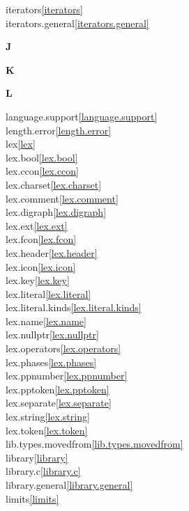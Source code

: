 \begin{multicols}{2}
iterators\quad\ref{iterators}\\
iterators.general\quad\ref{iterators.general}\\
\par \textbf{J}\par
\par \textbf{K}\par
\par \textbf{L}\par
language.support\quad\ref{language.support}\\
length.error\quad\ref{length.error}\\
lex\quad\ref{lex}\\
lex.bool\quad\ref{lex.bool}\\
lex.ccon\quad\ref{lex.ccon}\\
lex.charset\quad\ref{lex.charset}\\
lex.comment\quad\ref{lex.comment}\\
lex.digraph\quad\ref{lex.digraph}\\
lex.ext\quad\ref{lex.ext}\\
lex.fcon\quad\ref{lex.fcon}\\
lex.header\quad\ref{lex.header}\\
lex.icon\quad\ref{lex.icon}\\
lex.key\quad\ref{lex.key}\\
lex.literal\quad\ref{lex.literal}\\
lex.literal.kinds\quad\ref{lex.literal.kinds}\\
lex.name\quad\ref{lex.name}\\
lex.nullptr\quad\ref{lex.nullptr}\\
lex.operators\quad\ref{lex.operators}\\
lex.phases\quad\ref{lex.phases}\\
lex.ppnumber\quad\ref{lex.ppnumber}\\
lex.pptoken\quad\ref{lex.pptoken}\\
lex.separate\quad\ref{lex.separate}\\
lex.string\quad\ref{lex.string}\\
lex.token\quad\ref{lex.token}\\
lib.types.movedfrom\quad\ref{lib.types.movedfrom}\\
library\quad\ref{library}\\
library.c\quad\ref{library.c}\\
library.general\quad\ref{library.general}\\
limits\quad\ref{limits}\\

\end{multicols}
